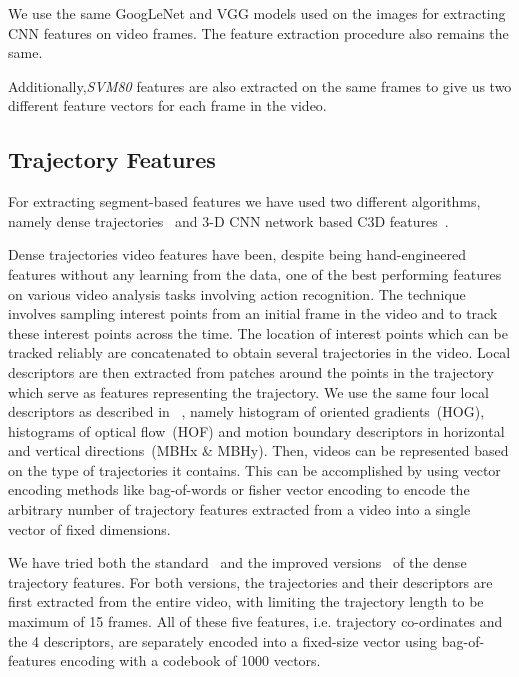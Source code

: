 We use the same GoogLeNet and VGG models used on the images for extracting
CNN features on video frames.
The feature extraction procedure also remains the same.

Additionally,\emph{SVM80} features are also extracted on the same frames to give
us two different feature vectors for each frame in the video.

\subsection{Trajectory Features}

For extracting segment-based features we have used two different algorithms,
namely dense trajectories~\cite{DBLP:conf/cvpr/WangKSL11, Wang2013} and 3-D CNN
network based C3D features~\cite{DBLP:C3D}.

Dense trajectories video features have been, despite being hand-engineered
features without any learning from the data, one of the best performing features
on various video analysis tasks involving action recognition.
The technique involves sampling interest points from an initial frame in the
video and to track these interest points across the time.
The location of interest points which can be tracked reliably are concatenated
to obtain several trajectories in the video.
Local descriptors are then extracted from patches around the points in the
trajectory which serve as features representing the trajectory.
We use the same four local descriptors as described in
~\cite{DBLP:conf/cvpr/WangKSL11, Wang2013}, namely histogram of oriented
gradients~(HOG), histograms of optical flow~(HOF) and motion boundary
descriptors in horizontal and vertical directions~(MBHx \& MBHy).
Then, videos can be represented based on the type of trajectories it contains.
This can be accomplished by using vector encoding methods like bag-of-words or
fisher vector encoding to encode the arbitrary number of trajectory features
extracted from a video into a single vector of fixed dimensions.

We have tried both the standard~\cite{DBLP:conf/cvpr/WangKSL11} and the improved
versions~\cite{Wang2013} of the dense trajectory features.
For both versions, the trajectories and their descriptors are first extracted
from the entire video, with limiting the trajectory length to be maximum of 15
frames.
All of these five features, i.e. trajectory co-ordinates and the 4 descriptors,
are separately encoded into a fixed-size vector using bag-of-features encoding
with a codebook of 1000 vectors.


